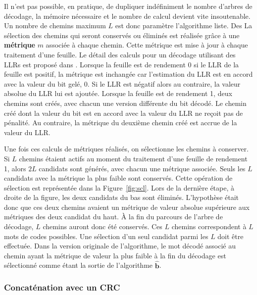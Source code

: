 Il n'est pas possible, en pratique, de dupliquer indéfiniment le nombre d'arbres de décodage, la mémoire nécessaire et le nombre de calcul devient vite insoutenable. Un nombre de chemins maximum $L$ est donc paramètre l'algorithme liste. Des La sélection des chemins qui seront conservés ou éliminés est réalisée grâce à une \textbf{métrique} $m$ associée à chaque chemin. Cette métrique est mise à jour à chaque traitement d'une feuille. Le détail des calculs pour un décodage utilisant des LLRs est proposé dans \cite{balatsoukas-stimming_llr-based_2015}. Lorsque la feuille est de rendement 0 si le LLR de la feuille est positif, la métrique est inchangée car l'estimation du LLR est en accord avec la valeur du bit gelé, 0. Si le LLR est négatif alors au contraire, la valeur absolue du LLR lui est ajoutée. Lorsque la feuille est de rendement 1, deux chemins sont créés, avec chacun une version différente du bit décodé. Le chemin créé dont la valeur du bit est en accord avec la valeur du LLR ne reçoit pas de pénalité. Au contraire, la métrique du deuxième chemin créé est accrue de la valeur du LLR.

Une fois ces calculs de métriques réalisés, on sélectionne les chemins à conserver. Si $L$ chemins étaient actifs au moment du traitement d'une feuille de rendement 1, alors $2L$ candidats sont générés, avec chacun une métrique associée. Seuls les $L$ candidats avec la métrique la plus faible sont conservés. Cette opération de sélection est représentée dans la Figure~\ref{fig:scl}. Lors de la dernière étape, à droite de la figure, les deux candidats du bas sont éliminés. L'hypothèse était donc que ces deux chemins avaient un métrique de valeur absolue supérieure aux métriques des deux candidat du haut. \`A la fin du parcours de l'arbre de décodage, $L$ chemins auront donc été conservés. Ces $L$ chemins correspondent à $L$ mots de codes possibles. Une sélection d'un seul candidat parmi les $L$ doit être effectuée. Dans la version originale de l'algorithme, le mot décodé associé au chemin ayant la métrique de valeur la plus faible à la fin du décodage est sélectionné comme étant la sortie de l'algorithme $\mathbold{\hat{b}}$.


\subsubsection{Concaténation avec un CRC}


